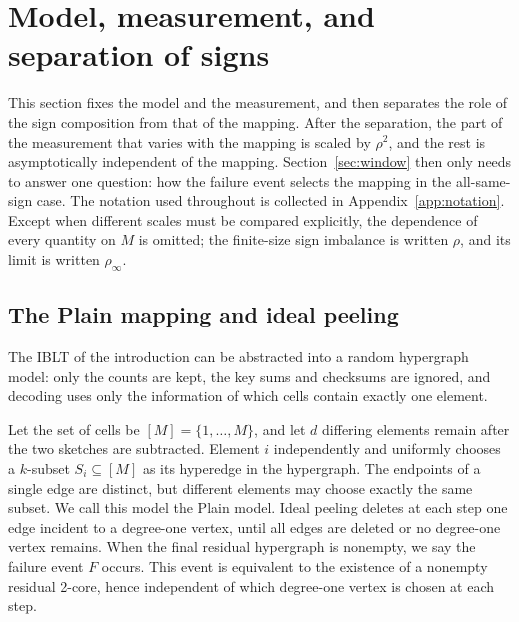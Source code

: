 \section{Model, measurement, and separation of signs}\label{sec:model}
This section fixes the model and the measurement, and then separates the role of the sign composition from that of the mapping.
After the separation, the part of the measurement that varies with the mapping is scaled by $\rho^2$, and the rest is
asymptotically independent of the mapping.
Section~\ref{sec:window} then only needs to answer one question: how the failure event selects the mapping in the
all-same-sign case.
The notation used throughout is collected in Appendix~\ref{app:notation}. Except when different scales must be compared
explicitly, the dependence of every quantity on $M$ is omitted; the finite-size sign
imbalance is written $\rho$, and its limit is written $\rho_\infty$.

\subsection{The Plain mapping and ideal peeling}
The IBLT of the introduction can be abstracted into a random hypergraph model: only the counts are kept, the key sums and
checksums are ignored, and decoding uses only the information of which cells
contain exactly one element.

Let the set of cells be $[M]=\{1,\ldots,M\}$, and let $d$ differing elements remain after the two sketches are subtracted. Element $i$ independently and
uniformly chooses a $k$-subset $S_i\subseteq[M]$ as its hyperedge in the hypergraph. The endpoints of a single edge are
distinct, but different elements may choose exactly the same subset. We call this model the
Plain model. Ideal peeling deletes at each step one edge incident to a degree-one vertex, until all edges are deleted or no
degree-one vertex remains. When the final residual hypergraph is nonempty, we say the failure event $F$ occurs. This event is
equivalent to the existence of a nonempty residual
2-core, hence independent of which degree-one vertex is chosen at each step.

